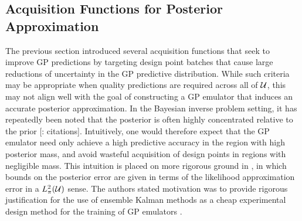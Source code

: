 \documentclass[12pt]{article}
\begin{document}
\subsection{Acquisition Functions for Posterior Approximation}
The previous section introduced several acquisition functions that seek to improve GP predictions by targeting
design point batches that cause large reductions of uncertainty in the GP predictive distribution. While such criteria may be appropriate 
when quality predictions are required across all of $\mathcal{U}$, this may not align well with the goal of constructing a GP emulator 
that induces an accurate posterior approximation. In the Bayesian inverse problem setting, it has repeatedly been noted that the 
posterior is often highly concentrated relative to the prior [\todo: citations]. Intuitively, one would therefore expect that the GP emulator need only 
achieve a high predictive accuracy in the region with high posterior mass, and avoid wasteful acquisition of design points in 
regions with negligible mass. This intuition is placed on more rigorous ground in \cite{StuartTeck2}, in which bounds on the 
posterior error are given in terms of the likelihood approximation error in a $L^2_{\pi}(\mathcal{U})$ sense. The authors 
stated motivation was to provide rigorous justification for the use of ensemble Kalman methods as a cheap experimental 
design method for the training of GP emulators \cite{CES, idealizedGCM}. 
\end{document}
